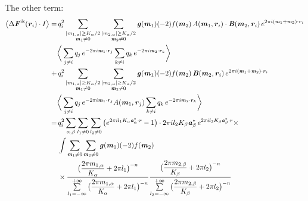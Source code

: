 \documentclass[aps,pre,preprint]{revtex4}
\renewcommand{\v}[1]{\textbf{\textit{#1}}}
\begin{document}
The other term:
\begin{align}\nonumber
  \big\langle
  \Delta\v F^{\textrm{ik}}(\v r_i)\cdot I
  \big\rangle
  = &\,
  q^2_i
  \sum_{
    \begin{subarray}{c}
      \vert m_{1,\alpha}\vert \geq K_\alpha/2\\
      \v m_1\neq 0
    \end{subarray}}
  \sum_{
    \begin{subarray}{c}
      \vert m_{2,\alpha}\vert \geq K_\alpha/2\\
      \v m_2\neq 0
    \end{subarray}}
  \v g(\v m_1) (-2)f(\v m_2) \,
  A(\v m_1, \v r_i)\cdot\v B(\v m_2, \v r_i)
  \,e^{2\pi i(\v m_1 + \v m_2)\cdot\v r_i} \\  \nonumber
  &
  \bigg\langle
  \sum_{j\neq i}q_j\,e^{-2\pi i\v m_1\cdot\v r_j}  
  \sum_{k\neq i}q_k\,e^{-2\pi i\v m_2\cdot\v r_k}
  \bigg\rangle \\\nonumber
  + &\,
  q^2_i
  \sum_{
    \begin{subarray}{c}
      \vert m_{1,\alpha}\vert \geq K_\alpha/2\\
      \v m_1\neq 0
    \end{subarray}}
  \sum_{
    \begin{subarray}{c}
      \vert m_{2,\alpha}\vert \geq K_\alpha/2\\
      \v m_2\neq 0
    \end{subarray}}
  \v g(\v m_1) (-2)f(\v m_2) \,
  \v B(\v m_2, \v r_i)
  \,e^{2\pi i(\v m_1 + \v m_2)\cdot\v r_i} \\  \nonumber
  &
  \bigg\langle
  \sum_{j\neq i}q_j\,e^{-2\pi i\v m_1\cdot\v r_j}A(\v m_1, \v r_j)
  \sum_{k\neq i}q_k\,e^{-2\pi i\v m_2\cdot\v r_k}
  \bigg\rangle \\\nonumber
  =&\,
  q^2_i
  \sum_{\alpha, \beta}\sum_{l_1\neq 0}\sum_{l_2\neq 0}
  \big(
  e^{2\pi i l_1 K_\alpha\v a_\alpha^\ast\cdot r} - 1
  \big)
  \cdot
  2\pi i l_2K_\beta \v a_\beta ^\ast\,e^{2\pi i l_2 K_\beta \v a_\beta^\ast\cdot r} \times \\\nonumber
  &\,
  \int
  \sum_{\v m_1\neq 0}\sum_{\v m_2\neq 0}
  \v g(\v m_1) (-2) f(\v m_2) \\\nonumber
  &\,\times
  \frac
  {\big(\dfrac{2\pi m_{1,\alpha}}{K_\alpha} + 2\pi l_1\big)^{-n}}
  {\sum\limits_{l_1=-\infty}^{+\infty}
    \big(\dfrac{2\pi m_{1,\alpha}}{K_\alpha} + 2\pi l_1\big)^{-n}}
  \frac
  {\big(\dfrac{2\pi m_{2,\beta}}{K_\beta} + 2\pi l_2\big)^{-n}}
  {\sum\limits_{l_2=-\infty}^{+\infty}
    \big(\dfrac{2\pi m_{2,\beta}}{K_\beta} + 2\pi l_2\big)^{-n}}

\end{align}
\end{document}

